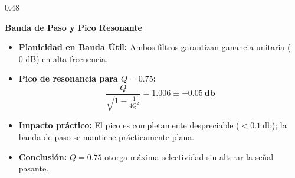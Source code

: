 \begin{frame}
\begin{columns}[t, onlytextwidth]
    \begin{column}{0.48\textwidth}
      \begin{tarjeta}
        {\fontsize{8.5pt}{10.5pt}\selectfont \textbf{\color{NavyDark} Banda de Paso y Pico Resonante}}\\[2pt]
        {\fontsize{7.5pt}{9.2pt}\selectfont
        \begin{itemize}\setlength{\itemsep}{2pt}
          \item \textbf{Planicidad en Banda Útil:}
          Ambos filtros garantizan ganancia unitaria ($0\text{ dB}$) en alta frecuencia.
          \item \textbf{Pico de resonancia para $Q = 0.75$:}
          \[ \frac{Q}{\sqrt{1 - \frac{1}{4Q^2}}} = \num{1.006} \equiv \mathbf{+0.05\ \unit{\decibel}} \]
          \item \textbf{Impacto práctico:}
          El pico es completamente despreciable ($< \qty{0.1}{\decibel}$); la banda de paso se mantiene prácticamente plana.
          \item \textbf{Conclusión:} $Q = 0.75$ otorga máxima selectividad sin alterar la señal pasante.
        \end{itemize}
        }
      \end{tarjeta}
    \end{column}
  \end{columns}
\end{frame}


